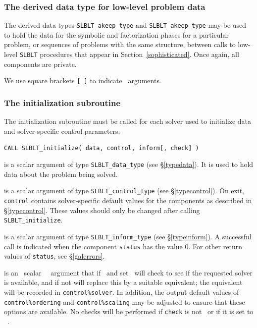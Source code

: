 \documentclass{galahad}
\newcommand{\packagename}{SLBLT}
\begin{document}

\subsubsection{The derived data type for low-level problem data}
\label{typeakeep}
\label{typefkeep}
The derived data types
{\tt \packagename\_akeep\_type} and
{\tt \packagename\_akeep\_type}
may be used to hold the data for the symbolic and factorization phases 
for a particular problem,
or sequences of problems with the same structure, between calls to
low-level {\tt \packagename} procedures that
appear in Section~\ref{sophisticated}.
Once again, all components are private.


\galarguments
We use square brackets {\tt [ ]} to indicate \optional\ arguments.


\subsubsection{The initialization subroutine}\label{subinit}
The initialization subroutine must be called for each solver used
to initialize data and solver-specific control parameters.

\hskip0.5in
{\tt CALL \packagename\_initialize( data, control, inform[, check] )}
\begin{description}

 is a scalar \intentout argument of type
{\tt \packagename\_data\_type}
(see \S\ref{typedata}). It is used to hold data about the problem being
solved.

 is a scalar \intentout argument of type
{\tt \packagename\_control\_type}
(see \S\ref{typecontrol}).
On exit, {\tt control} contains solver-specific default values for the
components as described in \S\ref{typecontrol}.
These values should only be changed after calling
{\tt \packagename\_initialize}.

 is a scalar \intentout argument of type
{\tt \packagename\_inform\_type}
(see \S\ref{typeinform}).
A successful call is indicated when the  component {\tt status} has the value 0.
For other return values of {\tt status}, see \S\ref{galerrors}.

 is an \optional\ scalar \logical\ \intentin\ argument 
that if \present\ and set \true\ will check to see if the requested solver 
is available, and if not will replace this by a suitable equivalent; the 
equivalent will be recorded in {\tt control\%solver}. 
In addition, the output default values of
{\tt control\%ordering} and {\tt control\%scaling} may be adjusted to ensure
that these options are available.
No checks will be performed if {\tt check} is not \present\ or if it is set
to \false\ .
\end{description}
\end{document}
